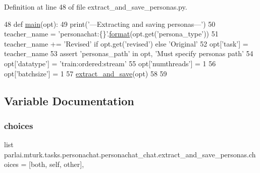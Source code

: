 Definition at line 48 of file extract\+\_\+and\+\_\+save\+\_\+personas.\+py.


\begin{DoxyCode}
48 \textcolor{keyword}{def }\hyperlink{namespacepersonachat__eval_1_1extract__and__save__personas_aa39f496bc78dfa28c1fbc2c4129a915c}{main}(opt):
49     print(\textcolor{stringliteral}{'---Extracting and saving personas---'})
50     teacher\_name = \textcolor{stringliteral}{'personachat:\{\}'}.\hyperlink{namespaceparlai_1_1chat__service_1_1services_1_1messenger_1_1shared__utils_a32e2e2022b824fbaf80c747160b52a76}{format}(opt.get(\textcolor{stringliteral}{'persona\_type'}))
51     teacher\_name += \textcolor{stringliteral}{'Revised'} \textcolor{keywordflow}{if} opt.get(\textcolor{stringliteral}{'revised'}) \textcolor{keywordflow}{else} \textcolor{stringliteral}{'Original'}
52     opt[\textcolor{stringliteral}{'task'}] = teacher\_name
53     \textcolor{keyword}{assert} \textcolor{stringliteral}{'personas\_path'} \textcolor{keywordflow}{in} opt, \textcolor{stringliteral}{'Must specify personas path'}
54     opt[\textcolor{stringliteral}{'datatype'}] = \textcolor{stringliteral}{'train:ordered:stream'}
55     opt[\textcolor{stringliteral}{'numthreads'}] = 1
56     opt[\textcolor{stringliteral}{'batchsize'}] = 1
57     \hyperlink{namespacepersonachat__eval_1_1extract__and__save__personas_a7bae99c34a0b3f49cbce1328146926fd}{extract\_and\_save}(opt)
58 
59 
\end{DoxyCode}


\subsection{Variable Documentation}
\mbox{\label{namespaceparlai_1_1mturk_1_1tasks_1_1personachat_1_1personachat__chat_1_1extract__and__save__personas_a71338ed717c1e7ba7c54bfff02589e4e}} 
\subsubsection{\texorpdfstring{choices}{choices}}
{\footnotesize\ttfamily list parlai.\+mturk.\+tasks.\+personachat.\+personachat\+\_\+chat.\+extract\+\_\+and\+\_\+save\+\_\+personas.\+choices = \mbox{[}\textquotesingle{}both\textquotesingle{}, \textquotesingle{}self\textquotesingle{}, \textquotesingle{}other\textquotesingle{}\mbox{]},}



